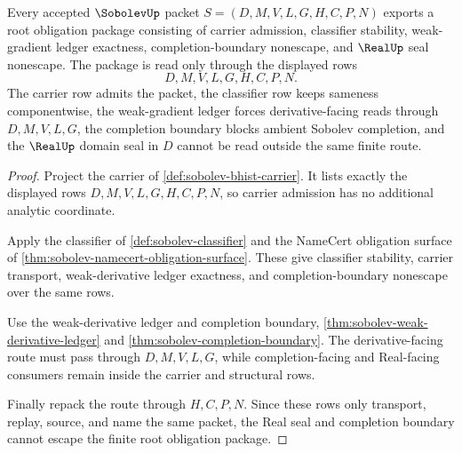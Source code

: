 \begin{theorem}
\label{thm:sobolev-root-obligation-package}
Every accepted $\SobolevUp$ packet $S=(D,M,V,L,G,H,C,P,N)$ exports a root obligation package consisting of carrier admission, classifier stability, weak-gradient ledger exactness, completion-boundary nonescape, and $\RealUp$ seal nonescape. The package is read only through the displayed rows
$$
D,M,V,L,G,H,C,P,N .
$$
The carrier row admits the packet, the classifier row keeps sameness componentwise, the weak-gradient ledger forces derivative-facing reads through $D,M,V,L,G$, the completion boundary blocks ambient Sobolev completion, and the $\RealUp$ domain seal in $D$ cannot be read outside the same finite route.
\end{theorem}
\begin{proof}
Project the carrier of \autoref{def:sobolev-bhist-carrier}. It lists exactly the displayed rows $D,M,V,L,G,H,C,P,N$, so carrier admission has no additional analytic coordinate.

Apply the classifier of \autoref{def:sobolev-classifier} and the NameCert obligation surface of \autoref{thm:sobolev-namecert-obligation-surface}. These give classifier stability, carrier transport, weak-derivative ledger exactness, and completion-boundary nonescape over the same rows.

Use the weak-derivative ledger and completion boundary, \autoref{thm:sobolev-weak-derivative-ledger} and \autoref{thm:sobolev-completion-boundary}. The derivative-facing route must pass through $D,M,V,L,G$, while completion-facing and Real-facing consumers remain inside the carrier and structural rows.

Finally repack the route through $H,C,P,N$. Since these rows only transport, replay, source, and name the same packet, the Real seal and completion boundary cannot escape the finite root obligation package.
\end{proof}

